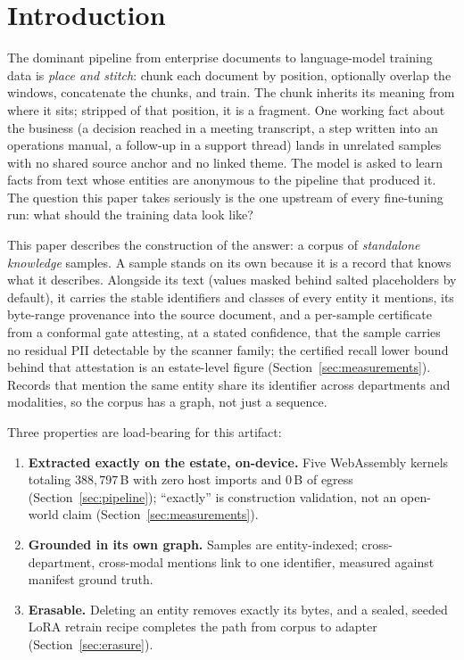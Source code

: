 \documentclass{article}
\begin{document}
\section{Introduction}
\label{sec:intro}

The dominant pipeline from enterprise documents to language-model training data is \emph{place and stitch}: chunk each document by position, optionally overlap the windows, concatenate the chunks, and train. The chunk inherits its meaning from where it sits; stripped of that position, it is a fragment. One working fact about the business (a decision reached in a meeting transcript, a step written into an operations manual, a follow-up in a support thread) lands in unrelated samples with no shared source anchor and no linked theme. The model is asked to learn facts from text whose entities are anonymous to the pipeline that produced it. The question this paper takes seriously is the one upstream of every fine-tuning run: what should the training data look like?

This paper describes the construction of the answer: a corpus of \emph{standalone knowledge} samples. A sample stands on its own because it is a record that knows what it describes. Alongside its text (values masked behind salted placeholders by default), it carries the stable identifiers and classes of every entity it mentions, its byte-range provenance into the source document, and a per-sample certificate from a conformal gate attesting, at a stated confidence, that the sample carries no residual PII detectable by the scanner family; the certified recall lower bound behind that attestation is an estate-level figure (Section~\ref{sec:measurements}). Records that mention the same entity share its identifier across departments and modalities, so the corpus has a graph, not just a sequence.

Three properties are load-bearing for this artifact:

\begin{enumerate}
  \item \textbf{Extracted exactly on the estate, on-device.} Five WebAssembly kernels totaling $388{,}797$\,B with zero host imports and $0$\,B of egress (Section~\ref{sec:pipeline}); ``exactly'' is construction validation, not an open-world claim (Section~\ref{sec:measurements}).
  \item \textbf{Grounded in its own graph.} Samples are entity-indexed; cross-department, cross-modal mentions link to one identifier, measured against manifest ground truth.
  \item \textbf{Erasable.} Deleting an entity removes exactly its bytes, and a sealed, seeded LoRA retrain recipe completes the path from corpus to adapter (Section~\ref{sec:erasure}).
\end{enumerate}
\end{document}
